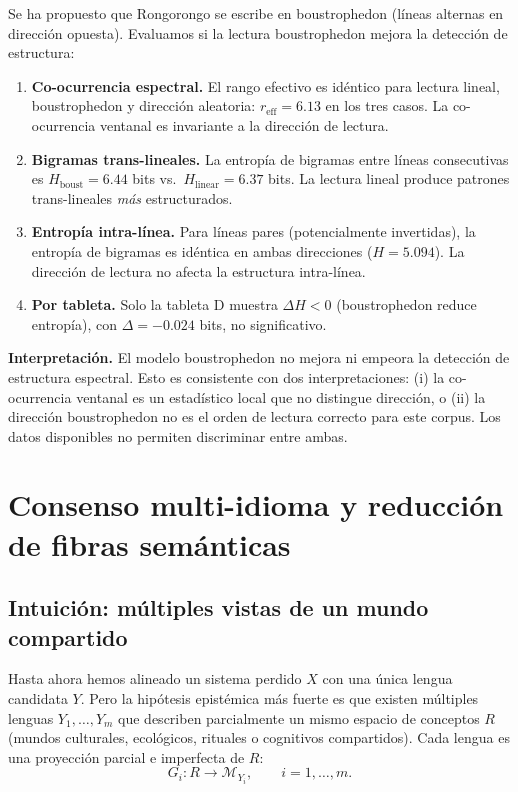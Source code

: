 \documentclass[11pt,a4paper]{article}
\newcommand{\1}{\mathbf{1}}
\numberwithin{equation}{section}
\begin{document}
Se ha propuesto que Rongorongo se escribe en boustrophedon (líneas alternas en dirección opuesta). Evaluamos si la lectura boustrophedon mejora la detección de estructura:

\begin{enumerate}[label=(\roman*)]
\item \textbf{Co-ocurrencia espectral.} El rango efectivo es idéntico para lectura lineal, boustrophedon y dirección aleatoria: $r_{\text{eff}}=6.13$ en los tres casos. La co-ocurrencia ventanal es invariante a la dirección de lectura.
\item \textbf{Bigramas trans-lineales.} La entropía de bigramas entre líneas consecutivas es $H_{\text{boust}}=6.44$ bits vs.\ $H_{\text{linear}}=6.37$ bits. La lectura lineal produce patrones trans-lineales \emph{más} estructurados.
\item \textbf{Entropía intra-línea.} Para líneas pares (potencialmente invertidas), la entropía de bigramas es idéntica en ambas direcciones ($H=5.094$). La dirección de lectura no afecta la estructura intra-línea.
\item \textbf{Por tableta.} Solo la tableta D muestra $\Delta H < 0$ (boustrophedon reduce entropía), con $\Delta = -0.024$ bits, no significativo.
\end{enumerate}

\textbf{Interpretación.} El modelo boustrophedon no mejora ni empeora la detección de estructura espectral. Esto es consistente con dos interpretaciones: (i) la co-ocurrencia ventanal es un estadístico local que no distingue dirección, o (ii) la dirección boustrophedon no es el orden de lectura correcto para este corpus. Los datos disponibles no permiten discriminar entre ambas.

\section{Consenso multi-idioma y reducción de fibras semánticas}

\subsection{Intuición: múltiples vistas de un mundo compartido}

Hasta ahora hemos alineado un sistema perdido $X$ con una única lengua candidata $Y$. Pero la hipótesis epistémica más fuerte es que existen múltiples lenguas $Y_1,\dots,Y_m$ que describen parcialmente un mismo espacio de conceptos $R$ (mundos culturales, ecológicos, rituales o cognitivos compartidos). Cada lengua es una proyección parcial e imperfecta de $R$:
\[
    G_i: R \to \mathcal{M}_{Y_i}, \qquad i=1,\dots,m.
\]
\end{document}
